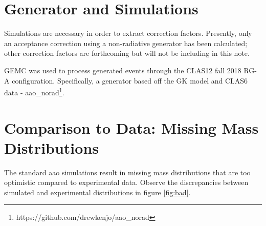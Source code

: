 \section{Generator and Simulations}
    Simulations are necessary in order to extract correction factors. Presently, only an acceptance correction using a non-radiative generator has been calculated; other correction factors are forthcoming but will not be including in this note. 

    GEMC was used to process generated events through the CLAS12 fall 2018 RG-A configuration. Specifically, a generator based off the GK model and CLAS6 data - aao\_norad\footnote{https://github.com/drewkenjo/aao\_norad}. 
    

\section{Comparison to Data: Missing Mass Distributions}

The standard aao simulations result in missing mass distributions that are too optimistic compared to experimental data. Observe the discrepancies between simulated and experimental distributions in figure \ref{fig:bad}. 


